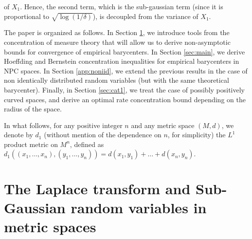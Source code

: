 \documentclass[10pt,a4paper]{article}
\theoremstyle{plain}
\theoremstyle{definition}
\theoremstyle{remark}
\begin{document}
of $X_1$. Hence, the second term, which is the sub-gaussian term (since it is proportional to $\sqrt{\log(1/\delta)}$), is decoupled from the variance of $X_1$. 



The paper is organized as follows. In Section \ref{sec:Laplace}, we introduce tools from the concentration of measure theory that will allow us to derive non-asymptotic bounds for convergence of empirical barycenters. In Section \ref{sec:main}, we derive Hoeffding and Bernstein concentration inequalities for empirical barycenters in NPC spaces. In Section \ref{app:noniid}, we extend the previous results in the case of non identically distributed random variables (but with the same theoretical barycenter). Finally, in Section \ref{sec:cat1}, we treat the case of possibly positively curved spaces, and derive an optimal rate concentration bound depending on the radius of the space.


In what follows, for any positive integer $n$ and any metric space $(M,d)$, we denote by $d_1$ (without mention of the dependence on $n$, for simplicity) the $L^1$ product metric on $M^n$, defined as $d_1((x_1,\ldots,x_n),(y_1,\ldots,y_n))=d(x_1,y_1)+\ldots+d(x_n,y_n)$.



\section{The Laplace transform and Sub-Gaussian random variables in metric spaces}\label{sec:Laplace}
\end{document}

